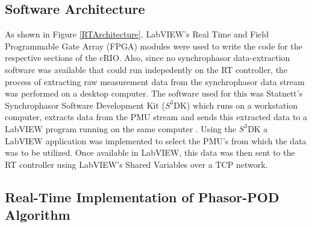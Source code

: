 \documentclass[journal]{IEEEtran}
\begin{document}

\subsection{Software Architecture}

As shown in Figure \ref{RTArchitecture}, LabVIEW's Real Time and Field Programmable Gate Array (FPGA) modules were used to write the code for the respective sections of the cRIO. Also,  since no synchrophasor data-extraction software was available that could run indepedently on the RT controller, the process of extracting raw measurement data from the synchrophasor data stream was performed on a desktop computer. The software used for this was Statnett\rq{s} Synchrophasor Software Development Kit ($S^{3}$DK) \cite{SDK} which runs on a workstation computer, extracts data from the PMU stream and sends this extracted data to a LabVIEW program running on the same computer \cite{SDK}. Using the $S^{3}$DK a LabVIEW application was implemented to select the PMU\rq{s} from which the data was to be utilized. Once available in LabVIEW, this data was then sent to the RT controller using LabVIEW\rq{s} Shared Variables \cite{NISharedVar} over a TCP network.

\subsection{Real-Time Implementation of Phasor-POD Algorithm}

\end{document}

